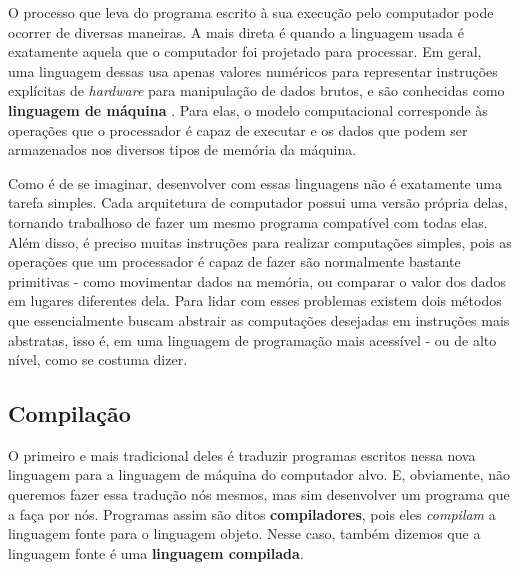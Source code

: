     O processo que leva do programa escrito à sua execução pelo computador pode
    ocorrer de diversas maneiras. A mais direta é quando a linguagem usada é
    exatamente aquela que o computador foi projetado para processar. Em geral,
    uma linguagem dessas usa apenas valores numéricos para representar
    instruções explícitas de \emph{hardware} para manipulação de dados brutos,
    e são conhecidas como \textbf{linguagem de máquina} \cite{org&arch:00}.
    Para elas, o modelo computacional corresponde às operações que o processador
    é capaz de executar e os dados que podem ser armazenados nos diversos tipos
    de memória da máquina.

    
    Como é de se imaginar, desenvolver com essas linguagens não é exatamente uma
    tarefa simples. Cada arquitetura de computador possui uma versão própria
    delas, tornando trabalhoso de fazer um mesmo programa compatível com todas
    elas. Além disso, é preciso muitas instruções para realizar computações
    simples, pois as operações que um processador é capaz de fazer são
    normalmente bastante primitivas - como movimentar dados na memória, ou
    comparar o valor dos dados em lugares diferentes dela. Para lidar com esses
    problemas existem dois métodos que essencialmente buscam abstrair as
    computações desejadas em instruções mais abstratas, isso é, em uma linguagem
    de programação mais acessível - ou de alto nível, como se costuma dizer.

    \subsection{Compilação}
    \label{cap:conceitos:maquina:compilacao}

    O primeiro e mais tradicional deles é traduzir programas escritos nessa
    nova linguagem para a linguagem de máquina do computador alvo. E,
    obviamente, não queremos fazer essa tradução nós mesmos, mas sim desenvolver
    um programa que a faça por nós. Programas assim são ditos
    \textbf{compiladores}, pois eles \emph{compilam} a linguagem fonte para o
    linguagem objeto. Nesse caso, também dizemos que a linguagem fonte é uma
    \textbf{linguagem compilada}.
    
    
